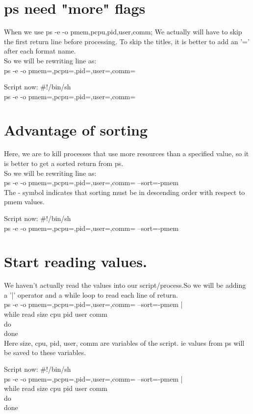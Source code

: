 \documentclass[12pt,a4paper]{article}
\begin{document}
\section{ps need "more" flags}

When we use ps -e -o pmem,pcpu,pid,user,comm; We actually will have to skip the first return line before processing. To skip the titles, it is better to add an '=' after each format name.\\So we will be rewriting line as:\\
ps -e -o pmem=,pcpu=,pid=,user=,comm=
\newline
\begin{flushleft}
Script now:
\newline
\#!/bin/sh\\
ps -e -o pmem=,pcpu=,pid=,user=,comm=\\
\end{flushleft}
\newpage
\section{Advantage of sorting}

Here, we are to kill processes that use more resources than a specified value, so it is better to get a sorted return from ps.\\So we will be rewriting line as:\\
ps -e -o pmem=,pcpu=,pid=,user=,comm= --sort=-pmem\\
The - symbol indicates that sorting must be in descending order with respect to pmem values.
\newline
\begin{flushleft}
Script now:
\newline
\#!/bin/sh\\
ps -e -o pmem=,pcpu=,pid=,user=,comm= --sort=-pmem\\
\end{flushleft}
\newpage
\section{Start reading values.}

We haven't actually read the values into our script/process.So we will be adding a '|' operator and a while loop to read each line of return.\\
ps -e -o pmem=,pcpu=,pid=,user=,comm= --sort=-pmem |\\
  while read size cpu pid user comm\\
  do\\
  done\\
Here size, cpu, pid, user, comm are variables of the script. ie values from ps will be saved to these variables.
\newline
\begin{flushleft}
Script now:
\newline
\#!/bin/sh\\
ps -e -o pmem=,pcpu=,pid=,user=,comm= --sort=-pmem |\\
  while read size cpu pid user comm\\
  do\\
  done\\
\end{flushleft}
\newpage
\end{document}
